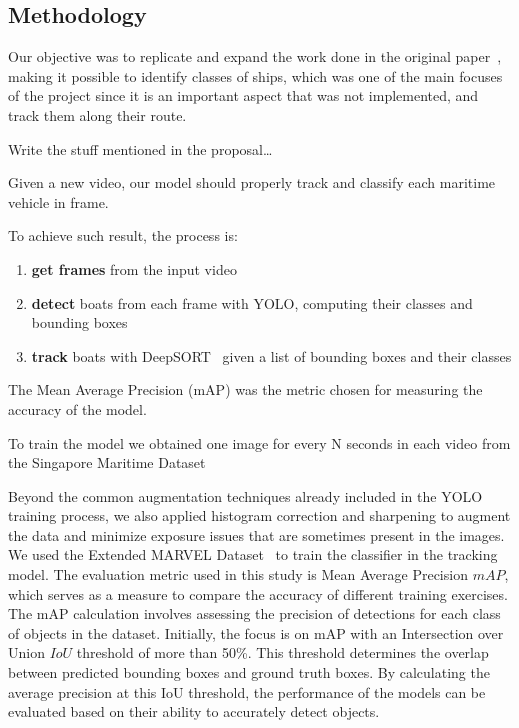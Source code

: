\documentclass[a4paper,12pt]{article}
\begin{document}
\begin{multicols}{2}
\section{Methodology}\label{sec:methodology}
Our objective was to replicate and expand the work done in the original paper~\cite{MVDTHME}, making it possible to identify classes of ships, which was one of the main focuses of the project since it is an important aspect that was not implemented, and track them along their route.

\hfill\newline
Write the stuff mentioned in the proposal\ldots %
\hfill\newline

Given a new video, our model should properly track and classify each maritime vehicle in frame.

To achieve such result, the process is:
\begin{enumerate}
    \item \textbf{get frames} from the input video
    \item \textbf{detect} boats from each frame with YOLO, computing their classes and bounding boxes
    \item \textbf{track} boats with DeepSORT~\cite{DEEPSORT} given a list of bounding boxes and their classes
\end{enumerate}

The Mean Average Precision (mAP) was the metric chosen for measuring the accuracy of the model.

To train the model we obtained one image for every N seconds in each video from the Singapore Maritime Dataset~\cite{SINGAPORE}

Beyond the common augmentation techniques already included in the YOLO training process, we also applied histogram correction and sharpening to augment the data and minimize exposure issues that are sometimes present in the images.
We used the Extended MARVEL Dataset~\cite{MARVEL} to train the classifier in the tracking model.
The evaluation metric used in this study is Mean Average Precision \(mAP\), which serves as a measure to compare the accuracy of different training exercises. The mAP calculation involves assessing the precision of detections for each class of objects in the dataset. Initially, the focus is on mAP with an Intersection over Union \(IoU\) threshold of more than 50\%. This threshold determines the overlap between predicted bounding boxes and ground truth boxes. By calculating the average precision at this IoU threshold, the performance of the models can be evaluated based on their ability to accurately detect objects.


\end{multicols}
\end{document}
